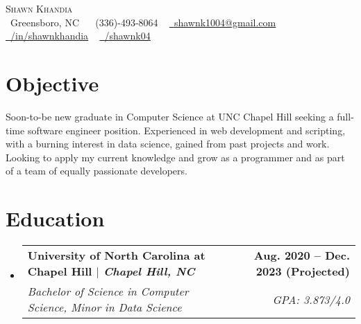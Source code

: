 \documentclass[letterpaper,11pt]{article}
\makeatletter
\newcommand{\resumeSubheading}[4]{
  \vspace{-2pt}\item
    \begin{tabular*}{1.0\textwidth}[t]{l@{\extracolsep{\fill}}r}
      \textbf{#1} & \textbf{\small #2} \\
      \textit{\small#3} & \textit{\small #4} \\
    \end{tabular*}\vspace{-7pt}
}
\newcommand{\resumeSubHeadingListStart}{\begin{itemize}[leftmargin=0.0in, label={}]}
\newcommand{\resumeSubHeadingListEnd}{\end{itemize}}
\makeatother
\begin{document}

\begin{center}
    {\Huge \scshape Shawn Khandia} \\ \vspace{1pt}
    \small \raisebox{-0.1\height} \faMapPin\ Greensboro, NC ~ \faPhone\ (336)-493-8064 ~ \href{mailto:shawnk1004@gmail.com}{\raisebox{-0.2\height}\faEnvelope\  \underline{shawnk1004@gmail.com}} ~ 
    \href{https://linkedin.com/in/shawnkhandia/}{\raisebox{-0.2\height}\faLinkedin\ \underline{/in/shawnkhandia}}  ~
    \href{https://github.com/shawnk04}{\raisebox{-0.2\height}\faGithub\ \underline{/shawnk04}}
    \vspace{-12pt}
\end{center}


\section{Objective}
      \small{Soon-to-be new graduate in Computer Science at UNC Chapel Hill seeking a full-time software engineer position. Experienced in web development and scripting, with a burning interest in data science, gained from past projects and work. Looking to apply my current knowledge and grow as a programmer and as part of a team of equally passionate developers.}
\vspace{-10pt}


\section{Education}
  \resumeSubHeadingListStart
    \resumeSubheading
      {{University of North Carolina at Chapel Hill} $|$ \emph{Chapel Hill, NC }}{Aug. 2020 -- Dec. 2023 (Projected)}
      {Bachelor of Science in Computer Science, Minor in Data Science}
      {GPA: 3.873/4.0}
  \resumeSubHeadingListEnd
\vspace{-12pt}


\end{document}
